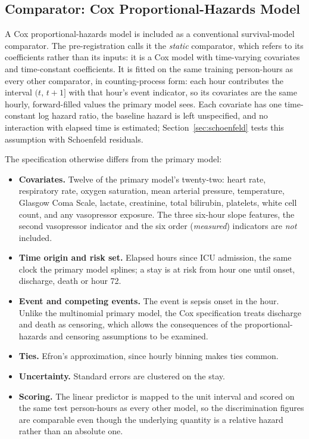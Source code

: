 \subsection{Comparator: Cox Proportional-Hazards Model}
\label{sec:cox_spec}

A Cox proportional-hazards model is included as a conventional survival-model
comparator. The pre-registration calls it the \emph{static} comparator, which
refers to its coefficients rather than its inputs: it is a Cox model with
time-varying covariates and time-constant coefficients. It is fitted on the
same training person-hours as every other comparator, in counting-process
form: each hour contributes the interval $(t,\, t+1]$ with that hour's event
indicator, so its covariates are the same hourly, forward-filled values the
primary model sees. Each covariate has one time-constant log hazard ratio, the
baseline hazard is left unspecified, and no interaction with elapsed time is
estimated; Section~\ref{sec:schoenfeld} tests this assumption with Schoenfeld
residuals.

The specification otherwise differs from the primary model:

\begin{itemize}
    \item \textbf{Covariates.} Twelve of the primary model's twenty-two: heart
    rate, respiratory rate, oxygen saturation, mean arterial pressure,
    temperature, Glasgow Coma Scale, lactate, creatinine, total bilirubin,
    platelets, white cell count, and any vasopressor exposure. The three
    six-hour slope features, the second vasopressor indicator and the six
    order (\emph{measured}) indicators are \emph{not} included.
    \item \textbf{Time origin and risk set.} Elapsed hours since ICU admission,
    the same clock the primary model splines; a stay is at risk from hour one
    until onset, discharge, death or hour 72.
    \item \textbf{Event and competing events.} The event is sepsis onset in the
    hour. Unlike the multinomial primary model, the Cox specification treats
    discharge and death as censoring, which allows the consequences of the
    proportional-hazards and censoring assumptions to be examined.
    \item \textbf{Ties.} Efron's approximation, since hourly binning makes ties
    common.
    \item \textbf{Uncertainty.} Standard errors are clustered on the stay.
    \item \textbf{Scoring.} The linear predictor is mapped to the unit interval
    and scored on the same test person-hours as every other model, so the
    discrimination figures are comparable even though the underlying quantity
    is a relative hazard rather than an absolute one.
\end{itemize}

